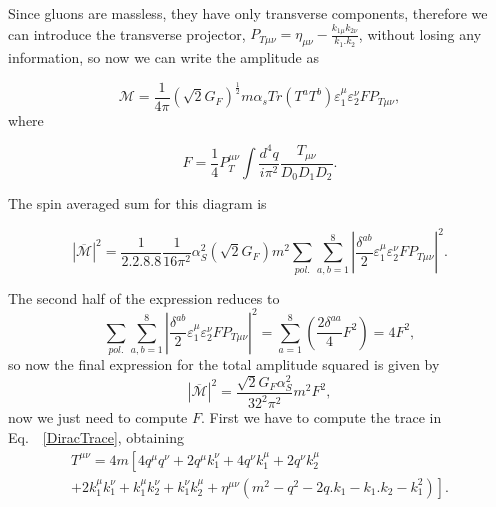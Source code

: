 \documentclass[EPJ,twocolumn]{webofc}
\begin{document}
Since gluons are massless, they have only transverse components, therefore we can introduce the transverse projector,  $P_{T\mu\nu} = \eta_{\mu\nu} - \frac{k_{1\mu}k_{2\nu}}{k_1.k_2}$, without losing any information, so now we can write the amplitude as

\begin{equation}
    \mathcal{M} = \frac{1}{4\pi}\left(\sqrt{2}G_F\right)^{\frac{1}{2}}m\alpha_sTr\left(T^aT^b\right)\varepsilon_1^{\mu}\varepsilon_2^{\nu} F P_{T\mu\nu},
\end{equation}
where

\begin{equation}
    F = \frac{1}{4}P_T^{\mu\nu}\int \frac{d^4q}{i\pi^2}\frac{T_{\mu\nu}}{D_0D_1D_2}.
\end{equation}

The spin averaged sum for this diagram is

\begin{equation}
    |\overline{\mathcal{M}}|^2 = \frac{1}{2.2.8.8}\frac{1}{16\pi^2}\alpha_S^2\left(\sqrt{2}G_F\right)m^2\sum_{pol.}\sum_{a,b=1}^8 \left|\frac{\delta^{ab}}{2}\varepsilon_1^{\mu}\varepsilon_2^{\nu} F P_{T\mu\nu}\right|^2.
\end{equation}


The second half of the expression reduces to
\begin{equation}
    \sum_{pol.}\sum_{a,b=1}^8 \left|\frac{\delta^{ab}}{2}\varepsilon_1^{\mu}\varepsilon_2^{\nu} F P_{T\mu\nu}\right|^2=
    \sum_{a=1}^8\left(\frac{2\delta^{aa}}{4}F^2\right) = 4F^2,
\end{equation}
so now the final expression for the total amplitude squared  is given by
\begin{equation}
    |\overline{\mathcal{M}}|^2  = \frac{\sqrt{2}G_F\alpha_S^2}{32^2\pi^2}m^2F^2,
\end{equation}
now we just need to compute $F$. First we have to compute the trace in Eq.~~\ref{DiracTrace}, obtaining
\begin{multline}
    T^{\mu\nu} = 4m\left[ 4q^\mu q^\nu+2q^\mu k_1^\nu+4q^\nu k_1^\mu+2q^\nu 
    k_2^\mu \right. \\\left. +2k_1^\mu k_1^\nu+k_1^\mu k_2^\nu+k_1^\nu k_2^\mu 
    +\eta^{\mu\nu}\left(m^2-q^2-2q.k_1-k_1.k_2-k_1^2 \right)\right].
\end{multline}
\end{document}
